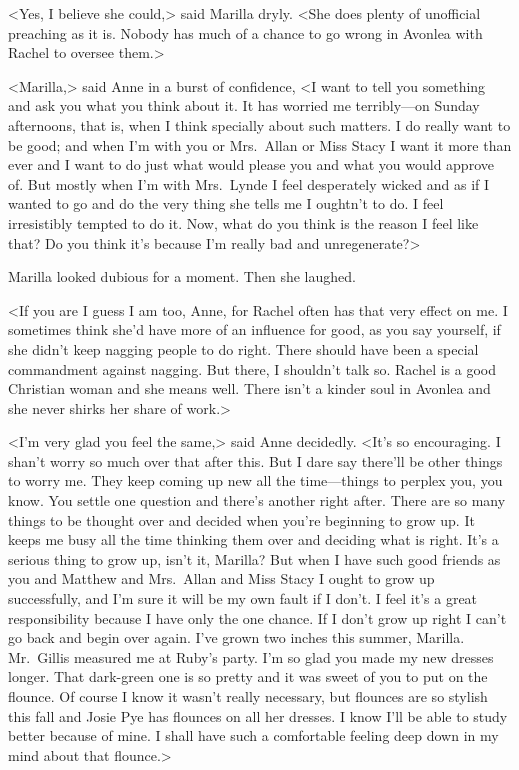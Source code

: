 <Yes, I believe she could,> said Marilla dryly. <She does plenty of unofficial preaching as it is. Nobody has much of a chance to go wrong in Avonlea with Rachel to oversee them.>

<Marilla,> said Anne in a burst of confidence, <I want to tell you something and ask you what you think about it. It has worried me terribly—on Sunday afternoons, that is, when I think specially about such matters. I do really want to be good; and when I'm with you or Mrs.~Allan or Miss Stacy I want it more than ever and I want to do just what would please you and what you would approve of. But mostly when I'm with Mrs.~Lynde I feel desperately wicked and as if I wanted to go and do the very thing she tells me I oughtn't to do. I feel irresistibly tempted to do it. Now, what do you think is the reason I feel like that? Do you think it's because I'm really bad and unregenerate?>

Marilla looked dubious for a moment. Then she laughed.

<If you are I guess I am too, Anne, for Rachel often has that very effect on me. I sometimes think she'd have more of an influence for good, as you say yourself, if she didn't keep nagging people to do right. There should have been a special commandment against nagging. But there, I shouldn't talk so. Rachel is a good Christian woman and she means well. There isn't a kinder soul in Avonlea and she never shirks her share of work.>

<I'm very glad you feel the same,> said Anne decidedly. <It's so encouraging. I shan't worry so much over that after this. But I dare say there'll be other things to worry me. They keep coming up new all the time—things to perplex you, you know. You settle one question and there's another right after. There are so many things to be thought over and decided when you're beginning to grow up. It keeps me busy all the time thinking them over and deciding what is right. It's a serious thing to grow up, isn't it, Marilla? But when I have such good friends as you and Matthew and Mrs.~Allan and Miss Stacy I ought to grow up successfully, and I'm sure it will be my own fault if I don't. I feel it's a great responsibility because I have only the one chance. If I don't grow up right I can't go back and begin over again. I've grown two inches this summer, Marilla. Mr.~Gillis measured me at Ruby's party. I'm so glad you made my new dresses longer. That dark-green one is so pretty and it was sweet of you to put on the flounce. Of course I know it wasn't really necessary, but flounces are so stylish this fall and Josie Pye has flounces on all her dresses. I know I'll be able to study better because of mine. I shall have such a comfortable feeling deep down in my mind about that flounce.>

